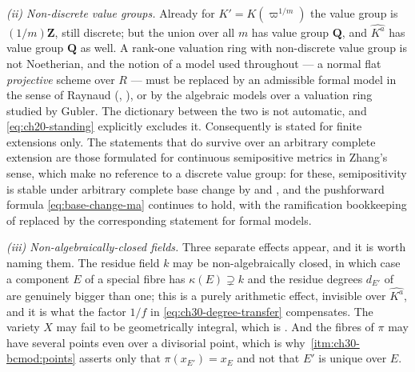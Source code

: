 \emph{(ii) Non-discrete value groups.}  Already for \(K'=K(\varpi^{1/m})\)
the value group is \((1/m)\mathbf Z\), still discrete; but the union over
all \(m\) has value group \(\mathbf Q\), and \(\widehat{K^{a}}\) has value
group \(\mathbf Q\) as well.  A rank-one valuation ring with non-discrete
value group is not Noetherian, and the notion of a model used throughout
 --- a normal flat \emph{projective} scheme over \(R\) ---
must be replaced by an admissible formal model in the sense of Raynaud
(\cite{BoschLutkebohmert1993}, \cite{RaynaudGruson1971}), or by the
algebraic models over a valuation ring studied by Gubler.  The dictionary
between the two is not automatic, and \eqref{eq:ch20-standing} explicitly
excludes it.  Consequently
 is stated for finite extensions only.  The
statements that do survive over an arbitrary complete extension are those
formulated for continuous semipositive metrics in Zhang's sense, which make
no reference to a discrete value group: for these, semipositivity is stable
under arbitrary complete base change by  and
\cite{GM19}, and the pushforward formula \eqref{eq:base-change-ma} continues
to hold, with the ramification bookkeeping of
 replaced by the corresponding statement
for formal models.

\emph{(iii) Non-algebraically-closed fields.}  Three separate effects
appear, and it is worth naming them.  The residue field \(k\) may be
non-algebraically closed, in which case a component \(E\) of a special
fibre has \(\kappa(E)\supsetneq k\) and the residue degrees \(d_{E'}\) of
 are genuinely bigger than one; this is a
purely arithmetic effect, invisible over \(\widehat{K^{a}}\), and it is
what the factor \(1/f\) in \eqref{eq:ch30-degree-transfer} compensates.  The
variety \(X\) may fail to be geometrically integral, which is
.  And the fibres of \(\pi\) may
have several points even over a divisorial point, which is why
\,\cref{itm:ch30-bcmod:points} asserts only
that \(\pi(x_{E'})=x_E\) and not that \(E'\) is unique over \(E\).

